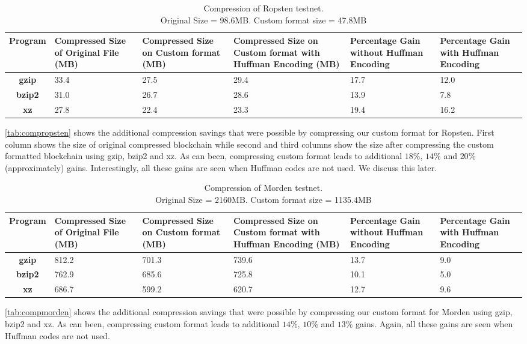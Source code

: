\begin{table}[H]
\centering
\captionsetup{justification=centering}
\begin{tabular}{ >{\bfseries}c| p{2cm} | p{2cm} |p{2cm} | p{1.5cm} | p{1.5cm} }
	Program & {Compressed Size of Original File (MB)} & {Compressed Size on Custom format (MB)} & {Compressed Size on Custom format with Huffman Encoding (MB)}& Percentage Gain without Huffman Encoding & Percentage Gain with Huffman Encoding\\
  \hline
  gzip  & 33.4 & 27.5 & 29.4 & 17.7 & 12.0 \\
  bzip2 & 31.0 & 26.7 & 28.6 & 13.9 & 7.8  \\
  xz   & 27.8 & 22.4 &  23.3 & 19.4 & 16.2 \\
\end{tabular}
\caption{Compression of Ropsten testnet. \\ Original Size = 98.6MB. Custom format size = 47.8MB}
\label{tab:compropsten}
\end{table}
\autoref{tab:compropsten} 
shows the additional compression savings that were possible by compressing 
our custom format for Ropsten.
First column shows the size of original compressed blockchain 
while
second and third columns show the size after compressing the custom formatted blockchain using gzip, bzip2 and xz. 
As can been, compressing custom format leads to additional $18\%$, $14\%$ and $20\%$ (approximately) gains. Interestingly, all these gains are seen when
Huffman codes are not used. We discuss this later.



\begin{table}[H]
\centering
\captionsetup{justification=centering}
\begin{tabular}{ >{\bfseries}c| p{2cm} | p{2cm} | p{2cm} | p{1.5cm} | p{1.5cm} }
	Program & {Compressed Size of Original File (MB)} & {Compressed Size on Custom format (MB)} & {Compressed Size on Custom format with Huffman Encoding (MB)} & Percentage Gain without Huffman Encoding & Percentage Gain with Huffman Encoding \\
  \hline
  gzip  & 812.2 & 701.3 & 739.6 & 13.7 & 9.0 \\
  bzip2 & 762.9 & 685.6 & 725.8 & 10.1 & 5.0 \\
  xz   & 686.7 & 599.2 &  620.7 & 12.7 & 9.6 \\
\end{tabular}
\caption{Compression of Morden testnet. \\Original Size = 2160MB. Custom format size = 1135.4MB}
\label{tab:compmorden}
\end{table}
\autoref{tab:compmorden}
shows the additional compression savings that were possible by compressing
our custom format for Morden using gzip, bzip2 and xz.
As can been, compressing custom format leads to additional $14\%$, $10\%$ and $13\%$  gains. Again, all these gains are seen when Huffman codes are not used.

